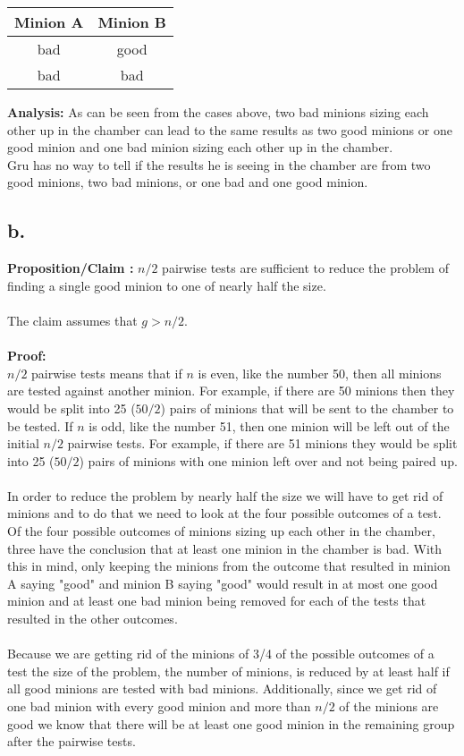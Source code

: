 \documentclass[12pt]{article}
\begin{document}
\begin{center}
\begin{tabular}{c|c}
Minion A & Minion B\\
\hline
bad & good\\
bad & bad\\
\end{tabular}
\end{center}

\noindent
\textbf{Analysis: }As can be seen from the cases above, two bad minions sizing each other up in the chamber 
can lead to the same results as two good minions or one good minion and one bad minion sizing each other up in the chamber.
\\
Gru has no way to tell if the results he is seeing in the chamber are from two good minions, two bad minions, or one bad and one good minion. 

\subsection*{b.}
\textbf{Proposition/Claim :} 
$n/2$ pairwise tests are sufficient to reduce the problem of finding a single good minion to one of nearly half the size.\\
\\
The claim assumes that $g > n/2$.\\
\\
\textbf{Proof: }\\
$n/2$ pairwise tests means that if $n$ is even, like the number 50, then all minions are tested against another minion.  For example, if there are 50 minions then they would be split into 25 ($50/2$) pairs of minions that will be sent to the chamber to be tested. 
If $n$ is odd, like the number 51, then one minion will be left out of the initial $n/2$ pairwise tests.  For example, if there are 51 minions they would be split into 25 ($50/2$) pairs of minions with one minion left over and not being paired up.\\
\\
In order to reduce the problem by nearly half the size we will have to get rid of minions and to do that we need to look at the four possible outcomes of a test.
Of the four possible outcomes of minions sizing up each other in the chamber, three have the conclusion that at least one minion in the chamber is bad.
With this in mind, only keeping the minions from the outcome that resulted in minion A saying "good" and minion B saying "good" would result in at most one good minion and at least one bad minion being removed for each of the tests that resulted in the other outcomes.\\
\\
Because we are getting rid of the minions of 3/4 of the possible outcomes of a test the size of the problem, the number of minions, is reduced by at least half if all good minions are tested with bad minions.
Additionally, since we get rid of one bad minion with every good minion and more than $n/2$ of the minions are good we know that there will be at least one good minion in the remaining group after the pairwise tests.
\end{document}
